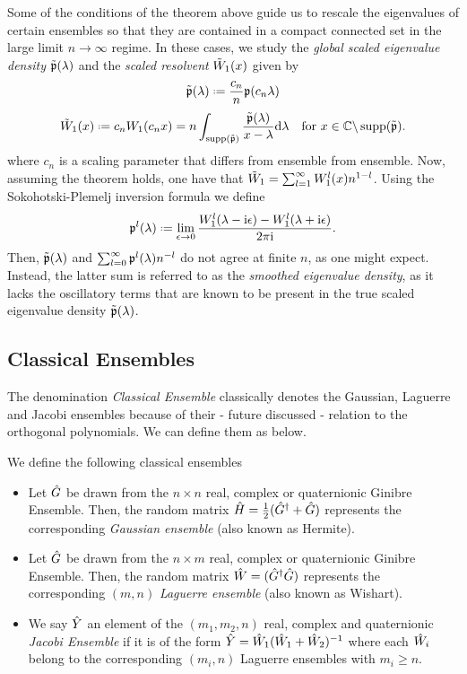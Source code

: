 Some of the conditions of the theorem above guide us to rescale the eigenvalues of certain ensembles so that they are contained in a compact connected set in the large limit $n \rightarrow \infty$ regime. In these cases, we study the \textit{global scaled eigenvalue density} $\tilde{\mathfrak{p}}(\lambda)$ and the \textit{scaled resolvent} $\tilde{W}_1(x)$ given by
\begin{equation}
	\Spe(\lambda) \deff \frac{c_n}{n} \pe(c_n \lambda)
\end{equation}
\begin{equation}
	\SW_1(x) \deff c_n \W_1(c_n x) = n \int_{\supp(\Spe)} \frac{\Spe(\lambda)}{x - \lambda} \dd \lambda \quad \text{for} \ x \in \C \backslash \supp(\Spe).
\end{equation}
where $c_n$ is a scaling parameter that differs from ensemble from ensemble. Now, assuming the theorem holds, one have that $\tilde{W}_1 =\sum_{l=1}^{\infty} W_1^l(x) n^{1-l}$. Using the Sokohotski-Plemelj inversion formula we define
\begin{equation}
	\pe^l(\lambda) \deff \lim_{\epsilon \rightarrow 0} \frac{\W_1^l(\lambda - \ii \epsilon) - \W_1^l(\lambda + \ii \epsilon)}{2\pi \ii}.
\end{equation} 
Then, $\tilde{\mathfrak{p}}(\lambda)$ and $\sum_{l=0}^{\infty} \mathfrak{p}^l(\lambda) n^{-l}$ do not agree at finite $n$, as one might expect. Instead, the latter sum is referred to as the \textit{smoothed eigenvalue density}, as it lacks the oscillatory terms that are known to be present in the true scaled eigenvalue density $\tilde{\mathfrak{p}}(\lambda)$.

\subsection{Classical Ensembles}

The denomination \textit{Classical Ensemble} classically denotes the Gaussian, Laguerre and Jacobi ensembles because of their - future discussed - relation to the orthogonal polynomials. We can define them as below.

\begin{definition}
	We define the following classical ensembles
	\begin{itemize}
		\item Let $\hat G$ be drawn from the $n \times n$ real, complex or quaternionic Ginibre Ensemble. Then, the random matrix $\hat H = \frac{1}{2} (\hat G^{\dagger} + \hat G)$ represents the corresponding \textit{Gaussian ensemble} (also known as Hermite).
		\item Let $\hat G$ be drawn from the $n \times m$ real, complex or quaternionic Ginibre Ensemble. Then, the random matrix $\hat W = (\hat G^{\dagger} \hat G)$ represents the corresponding $(m,n)$ \textit{Laguerre ensemble} (also known as Wishart).
		\item We say $\hat Y$ an element of the $(m_1, m_2, n)$ real, complex and quaternionic \textit{Jacobi Ensemble} if it is of the form $\hat Y = \hat W_1 (\hat W_1 + \hat W_2)^{-1}$ where each $\hat W_i$ belong to the corresponding $(m_i, n)$ Laguerre ensembles with $m_i \geq n$.
	\end{itemize}
	\label{Def: Direct Gaussian, Laguerre, Jacobi}
\end{definition}

